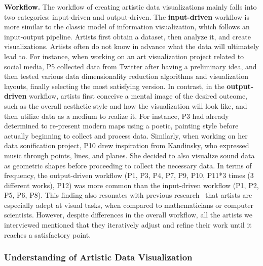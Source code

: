 \textbf{Workflow.}
The workflow of creating artistic data visualizations mainly falls into two categories: input-driven and output-driven. The \textbf{input-driven} workflow is more similar to the classic model of information visualization, which follows an input-output pipeline. 
Artists first obtain a dataset, then analyze it, and create visualizations. Artists often do not know in advance what the data will ultimately lead to. For instance, when working on an art visualization project related to social media, P5 collected data from Twitter after having a preliminary idea, and then tested various data dimensionality reduction algorithms and visualization layouts, finally selecting the most satisfying version.
In contrast, in the \textbf{output-driven} workflow, artists first conceive a mental image of the desired outcome, such as the overall aesthetic style and how the visualization will look like, and then utilize data as a medium to realize it. For instance, P3 had already determined to re-present modern maps using a poetic, painting style before actually beginning to collect and process data. Similarly, when working on her data sonification project, P10 drew inspiration from Kandinsky, who expressed music through points, lines, and planes. She decided to also visualize sound data as geometric shapes before proceeding to collect the necessary data. In terms of frequency, the output-driven workflow (P1, P3, P4, P7, P9, P10, P11*3 times (3 different works), P12) was more common than the input-driven workflow (P1, P2, P5, P6, P8). This finding also resonates with previous research~\cite{tandon2023visual} that artists are especially adept at visual tasks, when compared to mathematicians or computer scientists.
However, despite differences in the overall workflow, all the artists we interviewed mentioned that they iteratively adjust and refine their work until it reaches a satisfactory point. 


\subsubsection{Understanding of Artistic Data Visualization}
\label{sssec:understanding}

